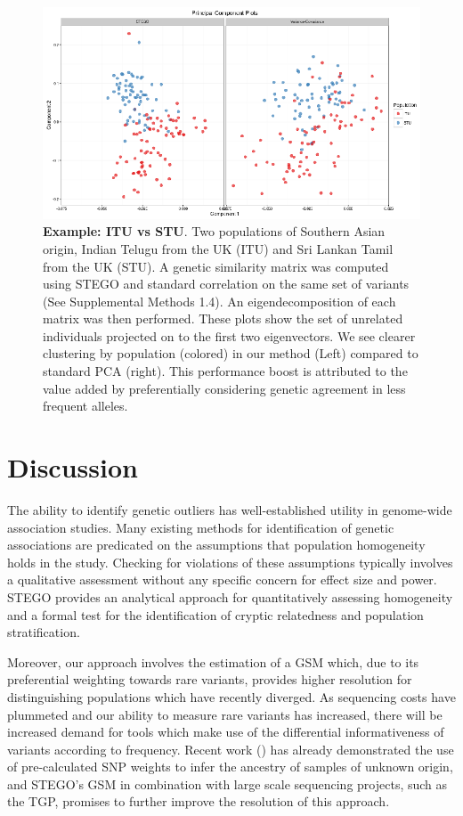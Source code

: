 \begin{figure}
\includegraphics[width=1\columnwidth]{./figures/figure5.eps}
\caption{\textbf{Example: ITU vs STU}. Two populations of Southern Asian origin,
Indian Telugu from the UK (ITU) and Sri Lankan Tamil from the UK (STU).
A genetic similarity matrix was computed using STEGO and standard
correlation on the same set of variants (See Supplemental Methods 1.4). An eigendecomposition of each matrix was then performed. These
plots show the set of unrelated individuals projected on to the first
two eigenvectors. We see clearer clustering by population (colored)
in our method (Left) compared to standard PCA (right). This performance
boost is attributed to the value added by preferentially considering
genetic agreement in less frequent alleles.}
\label{fig: ITUvsSTU}
\end{figure}


\section{Discussion}

The ability to identify genetic outliers has well-established utility
in genome-wide association studies. Many existing methods for identification
of genetic associations are predicated on the assumptions that population
homogeneity holds in the study. Checking for violations of these assumptions
typically involves a qualitative assessment without any specific concern
for effect size and power. STEGO provides an analytical approach for
quantitatively assessing homogeneity and a formal test for the identification
of cryptic relatedness and population stratification.  

Moreover, our approach involves the estimation of a GSM which, due to its preferential weighting towards rare variants, provides higher resolution for distinguishing populations which have recently diverged.  As sequencing costs have plummeted and our ability to measure rare variants has increased, there will be increased demand for tools which make use of the differential informativeness of variants according to frequency.  Recent work (\citealp{chen2013improved}) has already demonstrated the use of pre-calculated SNP weights to infer the ancestry of samples of unknown origin, and STEGO's GSM in combination with large scale sequencing projects, such as the TGP, promises to further improve the resolution of this approach.


